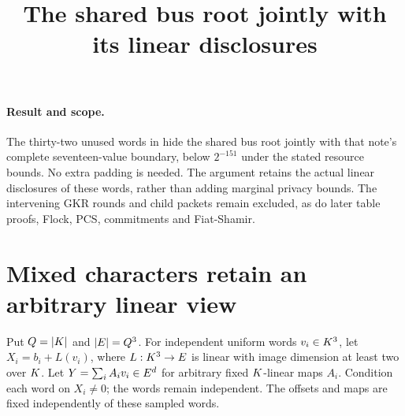 \documentclass[11pt]{article}
\title{The shared bus root jointly with its linear disclosures}
\author{}
\date{}
\begin{document}
\maketitle
\vspace{-2em}

\paragraph{Result and scope.} The thirty-two unused words in  hide the shared bus root jointly with that note's complete seventeen-value boundary, below $2^{-151}$ under the stated resource bounds. No extra padding is needed. The argument retains the actual linear disclosures of these words, rather than adding marginal privacy bounds. The intervening GKR rounds and child packets remain excluded, as do later table proofs, Flock, PCS, commitments and Fiat-Shamir.

\section{Mixed characters retain an arbitrary linear view}

Put $Q=|K|$ and $|E|=Q^3$. For independent uniform words $v_i\in K^3$, let $X_i=b_i+L(v_i)$, where $L:K^3\to E$ is linear with image dimension at least two over $K$. Let $Y=\sum_i A_i v_i\in E^d$ for arbitrary fixed $K$-linear maps $A_i$. Condition each word on $X_i\ne0$; the words remain independent. The offsets and maps are fixed independently of these sampled words.
\end{document}

